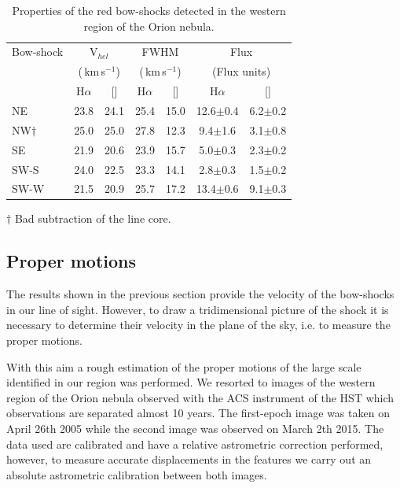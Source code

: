 \documentclass[a4paper,fleqn,usenatbib]{mnras}     %
\newcommand{\Ha} {H$\alpha$}      		%
\newcommand{\NII} {[\ion{N}{ii}]}            %
\newcommand{\kms}{\,km\,s$^{-1}$}	       %
\begin{document}
\begin{table}
\caption{Properties of the red bow-shocks detected in the western region of the Orion nebula.} 
\label{table:redbowshocks_prop} 
\centering 
\begin{tabular}{l c c c c c c }
\hline

Bow-shock    	&   \multicolumn{2}{c}{V$_{hel}$} &   \multicolumn{2}{c}{FWHM}    &  \multicolumn{2}{c}{Flux}         \\
				&   \multicolumn{2}{c}{(\kms)}    &   \multicolumn{2}{c}{(\kms)}  &  \multicolumn{2}{c}{(Flux units)}  \\
\hline
              		&      \Ha       &      \NII    &    \Ha        &      \NII     &      \Ha      			&   \NII             \\
\hline
NE				&	23.8	&	24.1	&	25.4	&	15.0	&	12.6$\pm$0.4	&	6.2$\pm$0.2	\\
NW$\dagger$	&	25.0	&	25.0	&	27.8		&	12.3	&	9.4$\pm$1.6		&	3.1$\pm$0.8	\\
SE				&	21.9	&	20.6	&	23.9	&	15.7	&	5.0$\pm$0.3		&	2.3$\pm$0.2	\\
SW-S			&	24.0	&	22.5	&	23.3	&	14.1	&	2.8$\pm$0.3		&	1.5$\pm$0.2	\\
SW-W			&	21.5	&	20.9	&	25.7	&	17.2		&	13.4$\pm$0.6	&	9.1$\pm$0.3	\\
\hline
\end{tabular}
\begin{list}{}{}\footnotesize{
\item $\dagger$ Bad subtraction of the line core.
}
\end{list}
\end{table}





\subsection{Proper motions}\label{sec:propermotions}
The results shown in the previous section provide the velocity of the bow-shocks in our line of sight. However, to draw a tridimensional 
picture of the shock it is necessary to determine their velocity in the plane of the sky, i.e. to measure the proper motions.

With this aim a rough estimation of the proper motions of the large scale identified in our region was performed. We resorted to images 
of the western region of the Orion nebula observed with the ACS instrument of the HST which observations are separated almost 10 years. 
The first-epoch image was taken on April 26th 2005 while the second image was observed on March 2th 2015. The data used are calibrated 
and have a relative astrometric correction performed, however, to measure accurate displacements in the features we carry out an absolute 
astrometric calibration between both images.
\end{document}
